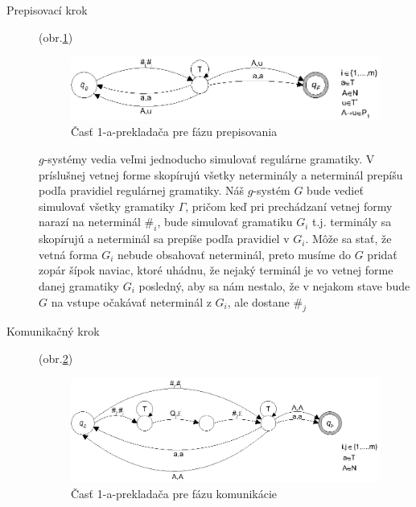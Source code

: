 \begin{dokaz}
\begin{description}
    \item[Prepisovací krok] (obr.\ref{pcgsgs2})
  \begin{figure}[ht]
    \centering
    \includegraphics{img/pcgsgs/pcgsgs2}
    \caption{Časť 1-a-prekladača pre fázu prepisovania}\label{pcgsgs2}
  \end{figure}

    $g$-systémy vedia veľmi jednoducho simulovať regulárne
    gramatiky. V príslušnej vetnej forme skopírujú všetky
    neterminály a neterminál prepíšu podľa pravidiel regulárnej
    gramatiky. Náš $g$-systém $G$ bude vedieť simulovať všetky gramatiky
    $\Gamma$, pričom keď pri prechádzaní vetnej formy narazí na
    neterminál $\#_i$, bude simulovať gramatiku $G_i$ t.j. terminály
    sa skopírujú a neterminál sa prepíše podľa pravidiel v $G_i$.
    Môže sa stať, že vetná forma $G_i$ nebude obsahovať neterminál,
    preto musíme do $G$ pridať zopár šípok naviac, ktoré uhádnu, že
    nejaký terminál je vo vetnej forme danej gramatiky $G_i$
    posledný, aby sa nám nestalo, že v nejakom stave bude $G$
    na vstupe očakávať neterminál z $G_i$, ale dostane $\#_j$

    \item[Komunikačný krok] (obr.\ref{pcgsgs3})
  \begin{figure}[ht]
    \centering
    \includegraphics{img/pcgsgs/pcgsgs3}
    \caption{Časť 1-a-prekladača pre fázu komunikácie}\label{pcgsgs3}
  \end{figure}


\end{description}
\end{dokaz}
